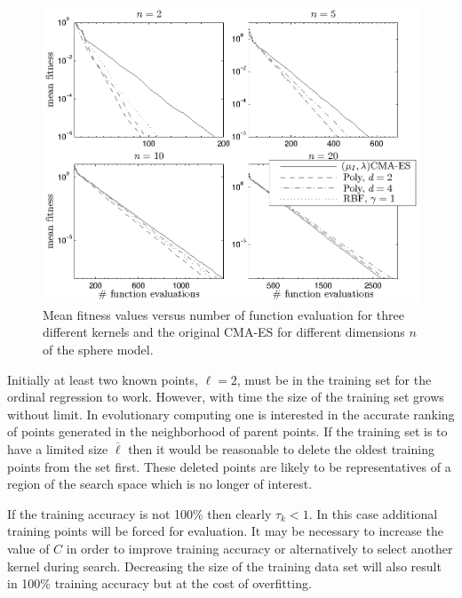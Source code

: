 \documentclass[10pt]{llncs}
\begin{document}
\begin{figure}[b!]
\centering
\includegraphics[width=0.8\columnwidth]{figs/sphere_1.eps}
\caption{Mean fitness values versus number of function
  evaluation for three different kernels and the original CMA-ES for
  different dimensions $n$ of the sphere model.}
\label{fig:sphere}
\end{figure}


Initially at least two known points, $\ell=2$, must be in the
training set for the ordinal regression to work. However, with
time the size of the training set grows without limit. In
evolutionary computing one is interested in the accurate ranking
of points generated in the neighborhood of parent points. If the
training set is to have a limited size $\overline{\ell}$ then it
would be reasonable to delete the oldest training points from
the set first. These deleted points are likely to be
representatives of a region of the search space which is no
longer of interest.


If the training accuracy is not 100\% then clearly $\tau_k < 1$.
In this case additional training points will be forced for
evaluation. It may be necessary to increase the value of $C$ in
order to improve training accuracy or alternatively to select
another kernel during search. Decreasing the size of the
training data set will also result in 100\% training accuracy
but at
the cost of overfitting.
\end{document}
